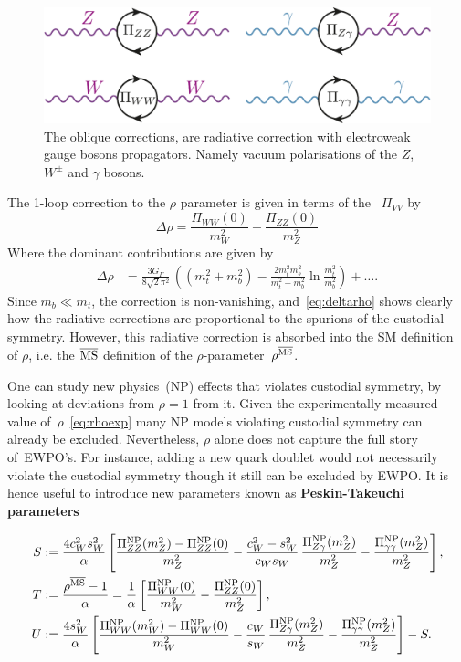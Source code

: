 \begin{figure}[htpb!]
	\centering
	\includegraphics[width=0.75\linewidth]{./figures/oblique_corrections}
	\caption{The oblique corrections, are radiative correction with electroweak gauge bosons propagators. Namely vacuum polarisations of the $Z$, $W^\pm$ and $\gamma$ bosons. }  \label{fig:oblique}
\end{figure}
The 1-loop correction to the $\rho$ parameter is given in terms of the ~$\Pi_{VV}$  by
\begin{equation}
\Delta \rho = \frac{\Pi_{WW}(0)}{m_W^2}- \frac{\Pi_{ZZ}(0)}{m_Z^2}
\end{equation}
Where the dominant contributions are given by~\cite{EINHORN1981146}
\begin{align}
\Delta \rho & = \frac{3 G_F}{8\sqrt{2}\pi^2}\,\left((m_t^2+m_b^2)-\frac{2m_t^2m_b^2}{m_t^2-m_b^2}\ln \frac{m_t^2}{m_b^2} \right)+\dots.
\label{eq:deltarho}
\end{align}
Since $m_b\ll m_t$, the correction is non-vanishing, and~\eqref{eq:deltarho} shows clearly how the radiative corrections are proportional to the spurions of the custodial symmetry. However, this radiative correction is absorbed into the SM definition of $\rho$, i.e. the $\overline{\mathrm{MS}}$ definition of the $\rho$-parameter~$\rho^{\overline{\mathrm{MS}}}$.
\par One can study  new physics~(NP) effects that violates custodial symmetry, by looking at deviations from $\rho=1$ from it. Given the experimentally measured value of~$\rho$~\eqref{eq:rhoexp} many NP models violating custodial symmetry can already be excluded. Nevertheless, $\rho$ alone does not capture the full story of~EWPO's. For instance, adding a new quark doublet would not necessarily violate the custodial symmetry though it still can be excluded by EWPO. It is hence useful to introduce new parameters known as \textbf{Peskin-Takeuchi parameters}~\cite{PhysRevLett.65.964,Peskin91estimationof,peskin1995introduction}
 \begin{tcolorbox}[title=Peskin-Takeuchi parameters,
	title filled=false,
	colback=Mahogany!5!white,
	colframe=Mahogany]
\begin{align}
	S &:=\frac{4 c_W^2 s_W^2}{\alpha} \left[ \frac{\Pi_{ZZ}^{\mathrm{NP}} (m_Z^2)- \Pi_{ZZ}^{\mathrm{NP}} (0)}{m_Z^2}  - \frac{c_W^2-s_W^2}{c_Ws_W}\,\frac{\Pi_{Z\gamma}^{\mathrm{NP}}(m_Z^2)}{m_Z^2}-\frac{\Pi_{\gamma\gamma}^{\mathrm{NP}}(m_Z^2)}{m_Z^2}\right],  \nonumber \\
	T &:=\frac{\rho^{\overline{\mathrm{MS}}}-1}{\alpha}  = \frac{1}{\alpha} \left[ \frac{\Pi^{\mathrm{NP}}_{WW}(0)}{m_W^2}- \frac{\Pi^{\mathrm{NP}}_{ZZ}(0)}{m_Z^2} \right] , \\
	U&:= \frac{4 s_W^2}{\alpha} \left[ \frac{\Pi_{WW}^{\mathrm{NP}} (m_W^2)- \Pi_{WW}^{\mathrm{NP}} (0)}{m_W^2}   - \frac{c_W}{s_W}\,\frac{\Pi_{Z\gamma}^{\mathrm{NP}}(m_Z^2)}{m_Z^2}-\frac{\Pi_{\gamma\gamma}^{\mathrm{NP}}(m_Z^2)}{m_Z^2}\right] -S .\nonumber 
\end{align}
\end{tcolorbox}
